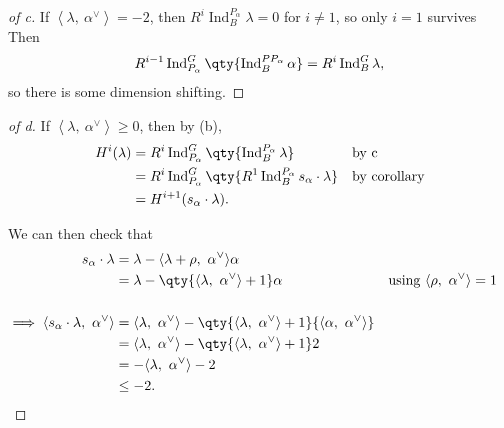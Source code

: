 \begin{proof}[of c]

If \({\left\langle {\lambda},~{\alpha^\vee} \right\rangle} = -2\), then
\(R^i \operatorname{Ind}_B^{P_\alpha} \lambda = 0\) for \(i\neq 1\), so
only \(i=1\) survives Then
\begin{align*}
R^{i-1} \operatorname{Ind}_{P_\alpha}^G \qty{ \operatorname{Ind}_B^{PP_\alpha} \alpha} = R^i \operatorname{Ind}_B^G \lambda
,\end{align*}
so there is some dimension shifting.

\end{proof}

\begin{proof}[of d]

If \({\left\langle {\lambda},~{\alpha^\vee} \right\rangle} \geq 0\),
then by (b),
\begin{align*}  
H^i(\lambda) 
&= R^i \operatorname{Ind}_{P_\alpha}^G \qty{ \operatorname{Ind}_B^{P_\alpha} \lambda } && \text{by c}\\
&= R^i \operatorname{Ind}_{P_\alpha}^G \qty{ R^1 \operatorname{Ind}_B^{P_\alpha} s_\alpha\cdot \lambda } && \text{by corollary}\\
&= H^{i+1}(s_\alpha\cdot \lambda)
.\end{align*}

We can then check that
\begin{align*}  
s_\alpha \cdot \lambda
&= \lambda - {\left\langle {\lambda + \rho},~{\alpha^\vee} \right\rangle}\alpha \\
&= \lambda - \qty{ {\left\langle {\lambda},~{\alpha^\vee} \right\rangle} + 1 }\alpha && \text{using } {\left\langle {\rho},~{\alpha^\vee} \right\rangle} = 1 \\ \\
\implies 
{\left\langle {s_\alpha \cdot \lambda},~{\alpha^\vee} \right\rangle}
&= {\left\langle {\lambda},~{\alpha^\vee} \right\rangle} - \qty{ {\left\langle {\lambda},~{\alpha^\vee} \right\rangle}+1 }{\left\langle {\alpha},~{\alpha^\vee} \right\rangle} \\
&= {\left\langle {\lambda},~{\alpha^\vee} \right\rangle} - \qty{ {\left\langle {\lambda},~{\alpha^\vee} \right\rangle}+1 }2 \\
&= -{\left\langle {\lambda},~{\alpha^\vee} \right\rangle} - 2 \\
&\leq -2
.\end{align*}

\end{proof}

